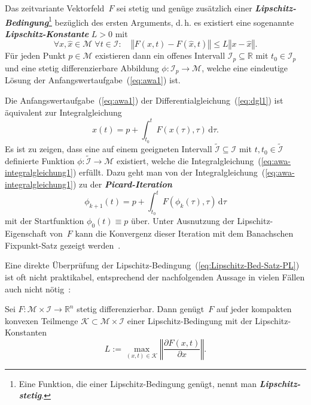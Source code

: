 \begin{theorem}
\label{thm:Picard-Lindeloeff}Das
zeitvariante Vektorfeld~$F$ sei stetig und genüge zusätzlich einer\textbf{\em
Lipschitz-Bedingung}\footnote{Eine Funktion, die einer Lipschitz-Bedingung genügt, nennt man \textbf{\em Lipschitz-stetig}.}
bezüglich des ersten Arguments, d.\,h. es existiert eine sogenannte
\textbf{\em Lipschitz-Konstante} $L>0$ mit
\begin{equation}
\forall x,\hat{x}\in\mathcal{M}\;\forall t\in\mathcal{I}:\quad\left\Vert F(x,t)-F(\hat{x},t)\right\Vert \leq L\left\Vert x-\hat{x}\right\Vert .\label{eq:Lipschitz-Bed-Satz-PL}
\end{equation}
Für jeden Punkt $p\in\mathcal{M}$ existieren dann ein offenes Intervall
$\mathcal{I}_{p}\subseteq{\mathbb{R}}$ mit $t_{0}\in\mathcal{I}_{p}$ und eine
stetig differenzierbare Abbildung $\phi:\mathcal{I}_{p}\to\mathcal{M}$,
welche eine eindeutige Lösung der Anfangswertaufgabe~(\ref{eq:awa1})
ist.
\end{theorem}
\begin{proofsketch}Die Anfangswertaufgabe~(\ref{eq:awa1}) der Differentialgleichung~(\ref{eq:dgl1})
ist äquivalent zur Integralgleichung
\begin{equation}
x(t)=p+\int_{t_{0}}^{t}F(x(\tau),\tau)\,{\mathrm{d}}\tau.\label{eq:awa-integralgleichung1}
\end{equation}
Es ist zu zeigen, dass eine auf einem geeigneten Intervall $\tilde{\mathcal{I}}\subseteq\mathcal{I}$
mit $t,t_{0}\in\tilde{\mathcal{I}}$ definierte Funktion $\phi:\tilde{\mathcal{I}}\to\mathcal{M}$
existiert, welche die Integralgleichung~(\ref{eq:awa-integralgleichung1})
erfüllt. Dazu geht man von der Integralgleichung~(\ref{eq:awa-integralgleichung1})
zu der \textbf{\em Picard-Iteration}
\begin{equation}
\phi_{k+1}(t)=p+\int_{t_{0}}^{t}F(\phi_{k}(\tau),\tau)\,{\mathrm{d}}\tau\label{eq:picard-iteration}
\end{equation}
mit der Startfunktion $\phi_{0}(t)\equiv p$ über. Unter Ausnutzung
der Lipschitz-Eigenschaft von~$F$ kann die Konvergenz dieser Iteration
mit dem Banachschen Fixpunkt-Satz gezeigt werden~\cite[§~31]{arnold2001}.\end{proofsketch}
Eine direkte Überprüfung der Lipschitz-Bedingung~(\ref{eq:Lipschitz-Bed-Satz-PL})
ist oft nicht praktikabel, entsprechend der nachfolgenden Aussage
in vielen Fällen auch nicht nötig~\cite[Abschn.~{4.2}]{koenigsberger2-2004}:
\begin{corollary}
\label{cor:Lipschitz-Mittelwertsatz}Sei
$F:\mathcal{M}\times\mathcal{I}\to{\mathbb{R}}^{n}$ stetig differenzierbar.
Dann genügt~$F$ auf jeder kompakten konvexen Teilmenge $\mathcal{K}\subset\mathcal{M}\times\mathcal{I}$
einer Lipschitz-Bedingung mit der Lipschitz-Konstanten
\[
L:=\max\limits _{(x,t)\in\mathcal{K}}\left\Vert \frac{\partial F(x,t)}{\partial x}\right\Vert .
\]
\end{corollary}

